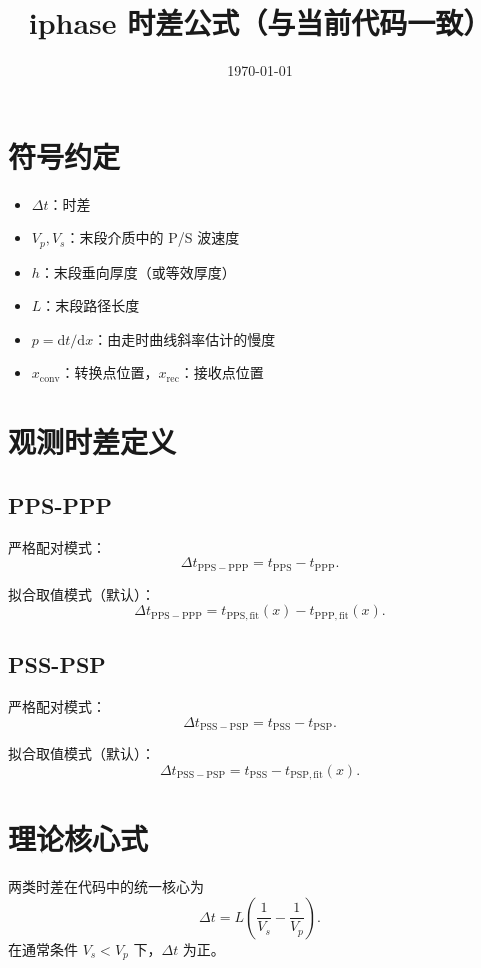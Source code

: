 \documentclass[11pt,a4paper]{article}
\title{iphase 时差公式（与当前代码一致）}
\author{}
\date{\today}
\begin{document}
\maketitle

\section{符号约定}
\begin{itemize}
\item $\Delta t$：时差
\item $V_p, V_s$：末段介质中的 P/S 波速度
\item $h$：末段垂向厚度（或等效厚度）
\item $L$：末段路径长度
\item $p=\mathrm{d}t/\mathrm{d}x$：由走时曲线斜率估计的慢度
\item $x_{\mathrm{conv}}$：转换点位置，$x_{\mathrm{rec}}$：接收点位置
\end{itemize}

\section{观测时差定义}
\subsection{PPS-PPP}
严格配对模式：
\begin{equation}
\Delta t_{\mathrm{PPS-PPP}} = t_{\mathrm{PPS}} - t_{\mathrm{PPP}}.
\end{equation}

拟合取值模式（默认）：
\begin{equation}
\Delta t_{\mathrm{PPS-PPP}} = t_{\mathrm{PPS,fit}}(x) - t_{\mathrm{PPP,fit}}(x).
\end{equation}

\subsection{PSS-PSP}
严格配对模式：
\begin{equation}
\Delta t_{\mathrm{PSS-PSP}} = t_{\mathrm{PSS}} - t_{\mathrm{PSP}}.
\end{equation}

拟合取值模式（默认）：
\begin{equation}
\Delta t_{\mathrm{PSS-PSP}} = t_{\mathrm{PSS}} - t_{\mathrm{PSP,fit}}(x).
\end{equation}

\section{理论核心式}
两类时差在代码中的统一核心为
\begin{equation}
\Delta t = L\left(\frac{1}{V_s} - \frac{1}{V_p}\right).
\end{equation}
在通常条件 $V_s<V_p$ 下，$\Delta t$ 为正。
\end{document}
